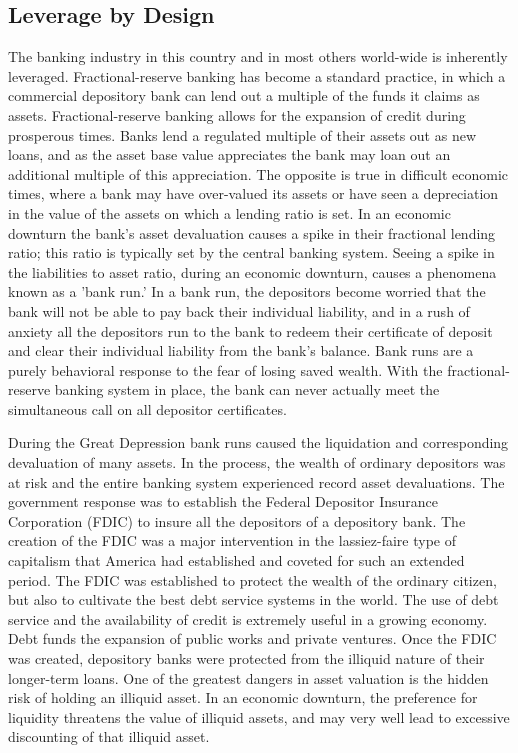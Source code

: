 \subsection{Leverage by Design}
The banking industry in this country and in most others world-wide is inherently leveraged.  Fractional-reserve banking has become a standard practice, in which a commercial depository bank can lend out a multiple of the funds it claims as assets.  Fractional-reserve banking allows for the expansion of credit during prosperous times.  Banks lend a regulated multiple of their assets out as new loans, and as the asset base value appreciates the bank may loan out an additional multiple of this appreciation.  The opposite is true in difficult economic times, where a bank may have over-valued its assets or have seen a depreciation in the value of the assets on which a lending ratio is set.  In an economic downturn the bank's asset devaluation causes a spike in their fractional lending ratio; this ratio is typically set by the central banking system.  Seeing a spike in the liabilities to asset ratio, during an economic downturn, causes a phenomena known as a 'bank run.'  In a bank run, the depositors become worried that the bank will not be able to pay back their individual liability, and in a rush of anxiety all the depositors run to the bank to redeem their certificate of deposit and clear their individual liability from the bank's balance.  Bank runs are a purely behavioral response to the fear of losing saved wealth.  With the fractional-reserve banking system in place, the bank can never actually meet the simultaneous call on all depositor certificates.  

During the Great Depression bank runs caused the liquidation and corresponding devaluation of many assets.  In the process, the wealth of ordinary depositors was at risk and the entire banking system experienced record asset devaluations.  The government response was to establish the Federal Depositor Insurance Corporation (FDIC) to insure all the depositors of a depository bank.  The creation of the FDIC was a major intervention in the lassiez-faire type of capitalism that America had established and coveted for such an extended period.  The FDIC was established to protect the wealth of the ordinary citizen, but also to cultivate the best debt service systems in the world.  The use of debt service and the availability of credit is extremely useful in a growing economy.  Debt funds the expansion of public works and private ventures.  Once the FDIC was created, depository banks were protected from the illiquid nature of their longer-term loans.  One of the greatest dangers in asset valuation is the hidden risk of holding an illiquid asset.  In an economic downturn, the preference for liquidity threatens the value of illiquid assets, and may very well lead to excessive discounting of that illiquid asset.


